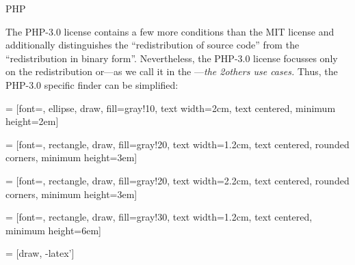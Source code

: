 \begin{license}{PHP} %

The PHP-3.0 license contains a few more conditions than the MIT license and
additionally distinguishes the \enquote{redistribution of source
code}\citePHP{} from the \enquote{redistribution in binary form}.\citePHP{}
Nevertheless, the PHP-3.0 license focusses only on the redistribution or---as we
call it in the \oslic---\emph{the 2others use
cases.} Thus, the PHP-3.0 specific finder can be simplified:

 = [font=\small, ellipse, draw, fill=gray!10, 
    text width=2cm, text centered, minimum height=2em]


 = [font=\footnotesize, rectangle, draw, fill=gray!20, 
    text width=1.2cm, text centered, rounded corners, minimum height=3em]

 = [font=\footnotesize, rectangle, draw, fill=gray!20, 
    text width=2.2cm, text centered, rounded corners, minimum height=3em]
    
 = [font=\tiny, rectangle, draw, fill=gray!30, 
    text width=1.2cm, text centered, minimum height=6em]

 = [draw, -latex']

\end{license}
